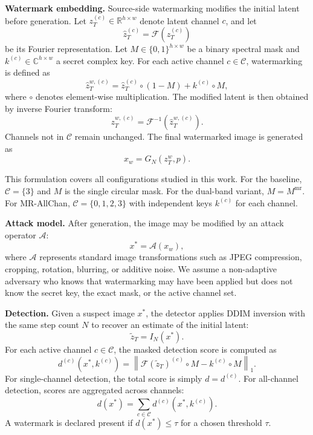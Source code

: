 \documentclass[10pt,twocolumn]{article}
\begin{document}
\textbf{Watermark embedding.}
Source-side watermarking modifies the initial latent before generation.
Let $z_T^{(c)} \in \mathbb{R}^{h \times w}$ denote latent channel $c$,
and let
\begin{equation}
    \hat{z}_T^{(c)} = \mathcal{F}(z_T^{(c)})
\end{equation}
be its Fourier representation.
Let $M \in \{0,1\}^{h \times w}$ be a binary spectral mask and
$k^{(c)} \in \mathbb{C}^{h \times w}$ a secret complex key.
For each active channel $c \in \mathcal{C}$, watermarking is defined as
\begin{equation}
    \hat{z}_T^{w,(c)}
    =
    \hat{z}_T^{(c)} \circ (1-M) + k^{(c)} \circ M,
    \label{eq:problem_embed}
\end{equation}
where $\circ$ denotes element-wise multiplication.
The modified latent is then obtained by inverse Fourier transform:
\begin{equation}
    z_T^{w,(c)} = \mathcal{F}^{-1}\!\left(\hat{z}_T^{w,(c)}\right).
\end{equation}
Channels not in $\mathcal{C}$ remain unchanged.
The final watermarked image is generated as
\begin{equation}
    x_w = G_N(z_T^w, p).
\end{equation}

This formulation covers all configurations studied in this work.
For the baseline, $\mathcal{C}=\{3\}$ and $M$ is the single circular
mask.
For the dual-band variant, $M=M^{\mathrm{mr}}$.
For MR-AllChan, $\mathcal{C}=\{0,1,2,3\}$ with independent keys
$k^{(c)}$ for each channel.

\textbf{Attack model.}
After generation, the image may be modified by an attack operator
$\mathcal{A}$:
\begin{equation}
    x^* = \mathcal{A}(x_w),
\end{equation}
where $\mathcal{A}$ represents standard image transformations such as
JPEG compression, cropping, rotation, blurring, or additive noise.
We assume a non-adaptive adversary who knows that watermarking may
have been applied but does not know the secret key, the exact mask,
or the active channel set.

\textbf{Detection.}
Given a suspect image $x^*$, the detector applies DDIM inversion with
the same step count $N$ to recover an estimate of the initial latent:
\begin{equation}
    \tilde{z}_T = I_N(x^*).
\end{equation}
For each active channel $c \in \mathcal{C}$, the masked detection score
is computed as
\begin{equation}
    d^{(c)}(x^*,k^{(c)})
    =
    \left\|
    \mathcal{F}(\tilde{z}_T)^{(c)} \circ M
    -
    k^{(c)} \circ M
    \right\|_1.
\end{equation}
For single-channel detection, the total score is simply $d=d^{(c)}$.
For all-channel detection, scores are aggregated across channels:
\begin{equation}
    d(x^*) = \sum_{c \in \mathcal{C}} d^{(c)}(x^*,k^{(c)}).
    \label{eq:problem_detect}
\end{equation}
A watermark is declared present if $d(x^*) \le \tau$ for a chosen
threshold $\tau$.
\end{document}
